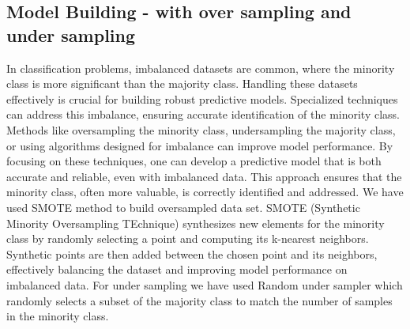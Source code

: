 \documentclass[10pt,a4paper]{style}
\begin{document}
\subsection{Model Building - with over sampling and under sampling}
In classification problems, imbalanced datasets are common, where the minority class is more significant than the majority class. Handling these datasets effectively is crucial for building robust predictive models. Specialized techniques can address this imbalance, ensuring accurate identification of the minority class. Methods like oversampling the minority class, undersampling the majority class, or using algorithms designed for imbalance can improve model performance. By focusing on these techniques, one can develop a predictive model that is both accurate and reliable, even with imbalanced data. This approach ensures that the minority class, often more valuable, is correctly identified and addressed. We have used SMOTE method to build oversampled data set. SMOTE (Synthetic Minority Oversampling TEchnique) synthesizes new elements for the minority class by randomly selecting a point and computing its k-nearest neighbors. Synthetic points are then added between the chosen point and its neighbors, effectively balancing the dataset and improving model performance on imbalanced data. For under sampling we have used Random under sampler which randomly selects a subset of the majority class to match the number of samples in the minority class. 
\end{document}
